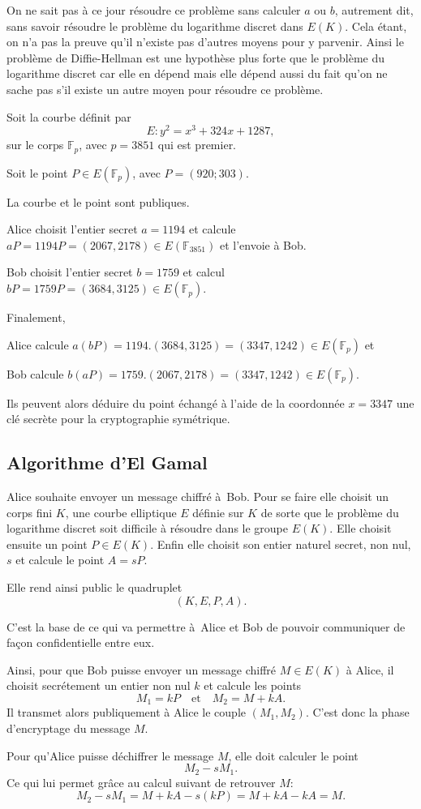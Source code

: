 On ne sait pas à ce jour résoudre ce problème sans calculer $a$ ou $b$, autrement dit, sans
savoir résoudre le problème du logarithme discret dans $E(K)$. Cela étant, on n'a pas la preuve
qu'il n'existe pas d'autres moyens pour y parvenir. Ainsi le problème de Diffie-Hellman est une
hypothèse plus forte que le problème du logarithme discret car elle en dépend mais elle dépend
aussi du fait qu'on ne sache pas s'il existe un autre moyen pour résoudre ce problème.

\begin{exemple}
    Soit la courbe définit par 
    \[
    E : y^2 = x^3 + 324x + 1287
    ,\] 
    sur le corps $\mathbb{F}_{p}$, avec $p=3851$ qui est premier. 

    Soit le point $P \in E(\mathbb{F}_{p})$, avec $P = (920;303)$.

    La courbe et le point sont publiques.

    Alice choisit l'entier secret $a=1194$ et calcule $aP=1194P=(2067,2178) \in
    E(\mathbb{F}_{3851})$ et l'envoie à Bob.

    Bob choisit l'entier secret $b = 1759$ et calcul $bP = 1759P = (3684,3125) \in
    E(\mathbb{F}_{p})$.

    Finalement,

    Alice calcule $a(bP)=1194.(3684,3125)=(3347,1242) \in E(\mathbb{F}_{p})$ et

    Bob calcule $b(aP) = 1759.(2067,2178) = (3347,1242) \in E(\mathbb{F}_{p})$.

    Ils peuvent alors déduire du point échangé à l'aide de la coordonnée $x=3347$ une clé
    secrète pour la cryptographie symétrique.
\end{exemple}

\subsection{Algorithme d'El Gamal}

Alice souhaite envoyer un message chiffré à Bob. Pour se faire elle choisit un corps fini $K$,
une courbe elliptique $E$ définie sur $K$ de sorte que le problème du logarithme discret soit
difficile à résoudre dans le groupe $E(K)$. Elle choisit ensuite un point $P \in E(K)$. Enfin
elle choisit son entier naturel secret, non nul, $s$ et calcule le point $A=sP$.

Elle rend ainsi public le quadruplet 
\[
    (K,E,P,A)
.\] 

C'est la base de ce qui va permettre à Alice et Bob de pouvoir communiquer de façon
confidentielle entre eux.

Ainsi, pour que Bob puisse envoyer un message chiffré $M \in E(K)$ à Alice, il choisit secrétement un entier non nul $k$ et calcule les points
\[
M_1=kP \quad \text{et} \quad M_2=M+kA
.\] 
Il transmet alors publiquement à Alice le couple $(M_1,M_2)$. C'est donc la phase d'encryptage du message $M$.

Pour qu'Alice puisse déchiffrer le message $M$, elle doit calculer le point
\[
M_2-sM_1
.\] 
Ce qui lui permet grâce au calcul suivant de retrouver $M$:
\[
M_2-sM_1=M+kA-s(kP)=M+kA-kA=M
.\] 
